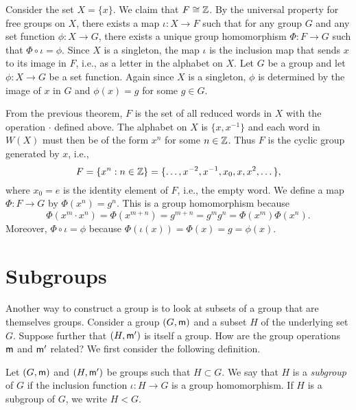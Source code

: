 \begin{example}
    Consider the set \(X = \{x\}\). We claim that \(F \cong \mathbb{Z}\). By the
    universal property for free groups on \(X\), there exists a map \(\iota : X
    \to F\) such that for any group \(G\) and any set function \(\phi : X \to
    G\), there exists a unique group homomorphism \(\Phi : F \to G\) such that
    \(\Phi \circ \iota = \phi\). Since \(X\) is a singleton, the map \(\iota\)
    is the inclusion map that sends \(x\) to its image in \(F\), i.e., as a
    letter in the alphabet on \(X\). Let \(G\) be a group and let \(\phi : X \to
    G\) be a set function. Again since \(X\) is a singleton, \(\phi\) is
    determined by the image of \(x\) in \(G\) and \(\phi(x) = g\) for some \(g
    \in G\).

    From the previous theorem, \(F\) is the set of all reduced words in \(X\)
    with the operation \(\cdot\) defined above. The alphabet on \(X\) is \(\{x,
    x^{-1}\}\) and each word in \(W(X)\) must then be of the form  \(x^n\) for
    some \(n \in \mathbb{Z}\). Thus \(F\) is the cyclic group generated by \(x\), i.e.,
    \[
        F = \{x^n : n \in \mathbb{Z}\} = \{\dots, x^{-2}, x^{-1}, x_0, x, x^2, \dots\},
    \]
    where \(x_0 = e\) is the identity element of \(F\), i.e., the empty word. We
    define a map \(\Phi : F \to G\) by \(\Phi(x^n) = g^n\). This is a group
    homomorphism because
    \[
        \Phi(x^m \cdot x^n) = \Phi(x^{m + n}) = g^{m + n} = g^m g^n = \Phi(x^m) \Phi(x^n).
    \]
    Moreover, \(\Phi \circ \iota = \phi\) because \(\Phi(\iota(x)) = \Phi(x) = g
    = \phi(x)\).
\end{example}

\section{Subgroups}

Another way to construct a group is to look at subsets of a group that are
themselves groups. Consider a group \((G, {\mathsf{m}})\) and a subset \(H\) of the
underlying set \(G\). Suppose further that \((H, {\mathsf{m}}')\) is itself a group.
How are the group operations \({\mathsf{m}}\) and \({\mathsf{m}}'\) related? We first consider
the following definition.

\begin{definition}
    Let \((G, {\mathsf{m}})\) and \((H, {\mathsf{m}}')\) be groups such that \(H \subset G\).
    We say that \(H\) is a \emph{subgroup} of \(G\) if the inclusion function
    \(\iota : H \to G\) is a group homomorphism. If \(H\) is a subgroup of
    \(G\), we write \(H < G\).
\end{definition}

